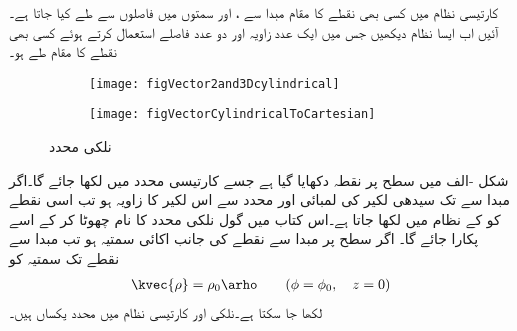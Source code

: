 کارتیسی نظام میں کسی بھی نقطے کا مقام مبدا سے ،  اور  سمتوں میں فاصلوں سے طے کیا جاتا ہے۔آئیں اب ایسا نظام دیکھیں جس میں ایک عدد زاویہ اور دو عدد فاصلے استعمال کرتے ہوئے کسی بھی نقطے کا مقام طے ہو۔
 \begin{figure}
\centering
\begin{subfigure}{0.5\textwidth}
\centering
\texttt{[image: figVector2and3Dcylindrical]}
\end{subfigure}%
%
\begin{subfigure}{0.5\textwidth}
\centering
\texttt{[image: figVectorCylindricalToCartesian]}
\end{subfigure}%
\caption{نلکی محدد}
\label{شکل_سمتیہ_نلکی_محدد}
\end{figure}

شکل -الف میں  سطح پر نقطہ  دکھایا گیا ہے جسے کارتیسی محدد میں  لکھا جائے گا۔اگر مبدا سے  تک سیدھی لکیر کی لمبائی  اور  محدد سے اس لکیر کا زاویہ  ہو تب اسی نقطے
 کو  کے نظام میں  لکھا جاتا ہے۔اس کتاب میں گول نلکی محدد کا نام چھوٹا کر کے اسے  پکارا جائے گا۔ اگر  سطح پر مبدا سے نقطے کی جانب اکائی سمتیہ  ہو تب مبدا سے نقطے تک سمتیہ کو
\begin{align}
\kvec{\rho}=\rho_0 \arho \quad \quad (\phi=\phi_0, \quad   z=0 )
\end{align}
   لکھا جا سکتا ہے۔نلکی  اور کارتیسی نظام میں   محدد یکساں ہیں۔

